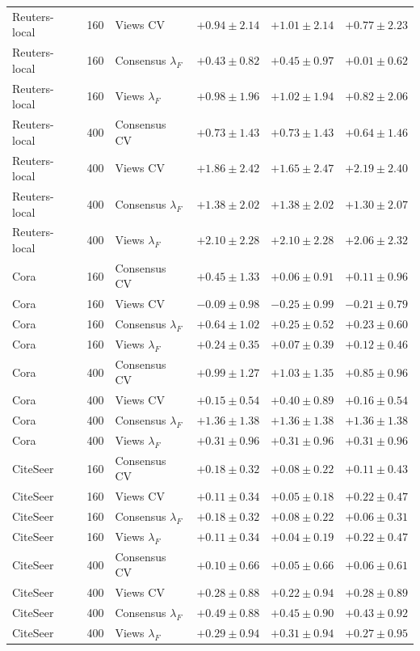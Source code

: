 \begin{longtable}{lrlrrr}
Reuters-local & 160 & Views CV & $+0.94\pm2.14$ & $+1.01\pm2.14$ & $+0.77\pm2.23$\\
Reuters-local & 160 & Consensus $\lambda_F$ & $+0.43\pm0.82$ & $+0.45\pm0.97$ & $+0.01\pm0.62$\\
Reuters-local & 160 & Views $\lambda_F$ & $+0.98\pm1.96$ & $+1.02\pm1.94$ & $+0.82\pm2.06$\\
Reuters-local & 400 & Consensus CV & $+0.73\pm1.43$ & $+0.73\pm1.43$ & $+0.64\pm1.46$\\
Reuters-local & 400 & Views CV & $+1.86\pm2.42$ & $+1.65\pm2.47$ & $+2.19\pm2.40$\\
Reuters-local & 400 & Consensus $\lambda_F$ & $+1.38\pm2.02$ & $+1.38\pm2.02$ & $+1.30\pm2.07$\\
Reuters-local & 400 & Views $\lambda_F$ & $+2.10\pm2.28$ & $+2.10\pm2.28$ & $+2.06\pm2.32$\\
Cora & 160 & Consensus CV & $+0.45\pm1.33$ & $+0.06\pm0.91$ & $+0.11\pm0.96$\\
Cora & 160 & Views CV & $-0.09\pm0.98$ & $-0.25\pm0.99$ & $-0.21\pm0.79$\\
Cora & 160 & Consensus $\lambda_F$ & $+0.64\pm1.02$ & $+0.25\pm0.52$ & $+0.23\pm0.60$\\
Cora & 160 & Views $\lambda_F$ & $+0.24\pm0.35$ & $+0.07\pm0.39$ & $+0.12\pm0.46$\\
Cora & 400 & Consensus CV & $+0.99\pm1.27$ & $+1.03\pm1.35$ & $+0.85\pm0.96$\\
Cora & 400 & Views CV & $+0.15\pm0.54$ & $+0.40\pm0.89$ & $+0.16\pm0.54$\\
Cora & 400 & Consensus $\lambda_F$ & $+1.36\pm1.38$ & $+1.36\pm1.38$ & $+1.36\pm1.38$\\
Cora & 400 & Views $\lambda_F$ & $+0.31\pm0.96$ & $+0.31\pm0.96$ & $+0.31\pm0.96$\\
CiteSeer & 160 & Consensus CV & $+0.18\pm0.32$ & $+0.08\pm0.22$ & $+0.11\pm0.43$\\
CiteSeer & 160 & Views CV & $+0.11\pm0.34$ & $+0.05\pm0.18$ & $+0.22\pm0.47$\\
CiteSeer & 160 & Consensus $\lambda_F$ & $+0.18\pm0.32$ & $+0.08\pm0.22$ & $+0.06\pm0.31$\\
CiteSeer & 160 & Views $\lambda_F$ & $+0.11\pm0.34$ & $+0.04\pm0.19$ & $+0.22\pm0.47$\\
CiteSeer & 400 & Consensus CV & $+0.10\pm0.66$ & $+0.05\pm0.66$ & $+0.06\pm0.61$\\
CiteSeer & 400 & Views CV & $+0.28\pm0.88$ & $+0.22\pm0.94$ & $+0.28\pm0.89$\\
CiteSeer & 400 & Consensus $\lambda_F$ & $+0.49\pm0.88$ & $+0.45\pm0.90$ & $+0.43\pm0.92$\\
CiteSeer & 400 & Views $\lambda_F$ & $+0.29\pm0.94$ & $+0.31\pm0.94$ & $+0.27\pm0.95$\\
\end{longtable}
\endgroup
